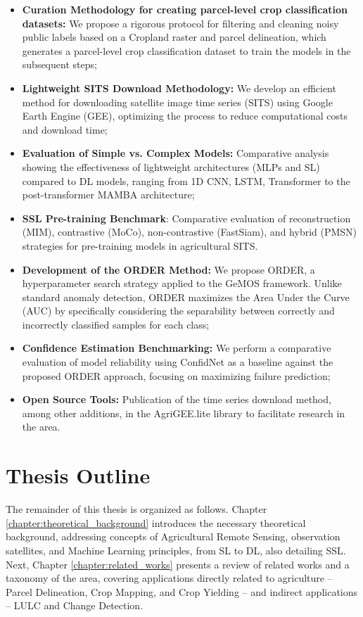 \begin{itemize}
    \item \textbf{Curation Methodology for creating parcel-level crop classification datasets:} We propose a rigorous protocol for filtering and cleaning noisy public labels based on a Cropland raster and parcel delineation, which generates a parcel-level crop classification dataset to train the models in the subsequent steps;
    \item \textbf{Lightweight SITS Download Methodology:} We develop an efficient method for downloading satellite image time series (SITS) using Google Earth Engine (GEE), optimizing the process to reduce computational costs and download time;
    \item \textbf{Evaluation of Simple vs. Complex Models:} Comparative analysis showing the effectiveness of lightweight architectures (MLPs and SL) compared to DL models, ranging from 1D CNN, LSTM, Transformer to the post-transformer MAMBA architecture;
    \item \textbf{SSL Pre-training Benchmark}: Comparative evaluation of reconstruction (MIM), contrastive (MoCo), non-contrastive (FastSiam), and hybrid (PMSN) strategies for pre-training models in agricultural SITS.
    \item \textbf{Development of the \ac{ORDER} Method:} We propose \ac{ORDER}, a hyperparameter search strategy applied to the \ac{GeMOS} \cite{vendramini2021opening} framework. Unlike standard anomaly detection, \ac{ORDER} maximizes the Area Under the Curve (AUC) by specifically considering the separability between correctly and incorrectly classified samples for each class;
    \item \textbf{Confidence Estimation Benchmarking:} We perform a comparative evaluation of model reliability using ConfidNet \citep{corbiere2019addressing} as a baseline against the proposed \ac{ORDER} approach, focusing on maximizing failure prediction;
    \item \textbf{Open Source Tools:} Publication of the time series download method, among other additions, in the AgriGEE.lite library to facilitate research in the area.
\end{itemize}

\section{Thesis Outline}

The remainder of this thesis is organized as follows. Chapter \ref{chapter:theoretical_background} introduces the necessary theoretical background, addressing concepts of Agricultural Remote Sensing, observation satellites, and Machine Learning principles, from \ac{SL} to \ac{DL}, also detailing \ac{SSL}. Next, Chapter \ref{chapter:related_works} presents a review of related works and a taxonomy of the area, covering applications directly related to agriculture -- Parcel Delineation, Crop Mapping, and Crop Yielding -- and indirect applications -- \ac{LULC} and Change Detection.

